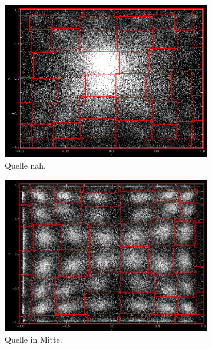 \documentclass[slug=PET, room=Andreas-Schubert-Bau\,\ 424A, supervisor=Carsten\ Bittrich, coursedate=10.\ 01.\ 2020]{../../Lab_Report_LaTeX/lab_report}
\begin{document}
\begin{figure}[h!]
  \centering
  \begin{subfigure}{0.32\textwidth}
    \centering
    \includegraphics[width=.9\textwidth]{../messungen/kalib/vergleich_mitte_nah_NAH.png}
    \caption{Quelle nah.}
    \label{fig:ab-nah}
  \end{subfigure}
  \begin{subfigure}{0.32\textwidth}
    \centering
    \includegraphics[width=.9\textwidth]{../messungen/kalib/vergleich_mitte_nah_MITTE.png}
    \caption{Quelle in Mitte.}
    \label{fig:ab-mitte}
  \end{subfigure}
  \begin{subfigure}{0.32\textwidth}
    \centering

\end{subfigure}
\end{figure}
\end{document}
